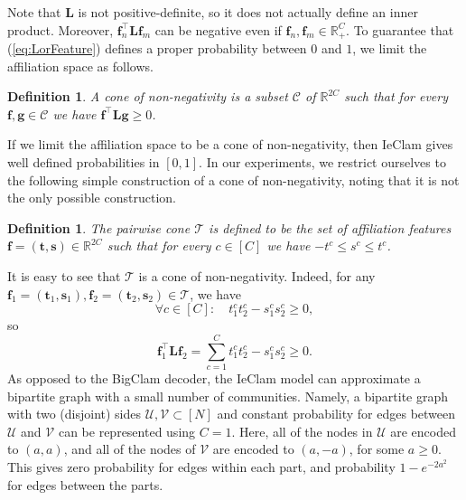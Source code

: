 \documentclass[letterpaper]{article} %
\newtheorem{definition}[theorem]{Definition}
\newcommand{\ron}[1]{{{\textcolor{red}{\textbf{[Ron:} {#1}\textbf{]}}}}}
\begin{document}
Note that $\mathbf{L}$ is not positive-definite, so it does not actually define an inner product. Moreover, $\mathbf{f}_n^\top  \mathbf{L} \mathbf{f}_m$ can be negative even if $\mathbf{f}_n,\mathbf{f}_m\in \mathbb{R}_+^C$. To guarantee that (\ref{eq:LorFeature}) defines a proper probability between $0$ and $1$, we limit the affiliation space as follows.  
%
\begin{definition}
  A \emph{cone of non-negativity} is a  subset $\mathcal{C}$ of $\mathbb{R}^{2C}$ such that for every $\mathbf{f},\mathbf{g}\in \mathcal{C}$ we have 
$\mathbf{f}^\top  \mathbf{L} \mathbf{g} \geq 0$.  
\end{definition}
If we limit the affiliation space to be a cone of non-negativity, then IeClam gives well defined probabilities in $[0,1]$.
In our experiments, we restrict ourselves to the following simple construction of a cone of non-negativity, noting that it is not the only possible construction. 
%
\begin{definition}
 The \emph{pairwise cone} $\mathcal{T}$ is defined to be the set of affiliation features $\mathbf{f}=(\mathbf{t},\mathbf{s})\in\mathbb{R}^{2C}$ such that for every $c\in[C]$ we have $-t^c \leq s^c\leq t^c$.    
\end{definition}
It is easy to see that $\mathcal{T}$ is a cone of non-negativity. Indeed, for any $\mathbf{f}_1=(\mathbf{t}_1,\mathbf{s}_1), \mathbf{f}_2=(\mathbf{t}_2,\mathbf{s}_2) \in \mathcal{T}$,  we have  
 \[\forall c\in[C]: \quad  t_1^c t_2^c - s_1^c s_2^c \geq 0,\] so
\[\mathbf{f}_1^\top  \mathbf{L} \mathbf{f}_2 = \sum_{c=1}^C t_1^c t_2^c - s_1^c s_2^c \geq 0.\] 
%
%
As opposed to the BigClam decoder, the IeClam model can approximate a bipartite graph with a small number of communities. Namely, a bipartite graph with two (disjoint) sides $\mathcal{U},\mathcal{V}\subset[N]$ and constant probability for edges between $\mathcal{U}$ and $\mathcal{V}$ can be represented using $C=1$. Here,  all of the nodes in $\mathcal{U}$ are encoded to $(a,a)$,  and all of the nodes of $\mathcal{V}$ are encoded to $(a,-a)$, for some $a\geq 0$. This gives zero probability for edges within each part, and probability $1- e^{-2a^2}$ for edges between the parts. %
\end{document}
